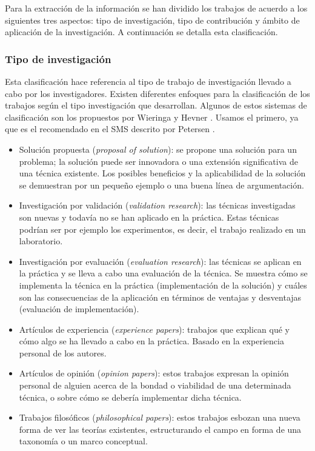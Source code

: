 Para la extracción de la información se han dividido los trabajos de acuerdo a los siguientes tres aspectos: tipo de investigación, tipo de contribución y ámbito de aplicación de la investigación. A continuación se detalla esta clasificación.

\subsubsection*{Tipo de investigación}
Esta clasificación hace referencia al tipo de trabajo de investigación llevado a cabo por los investigadores. Existen diferentes enfoques para la clasificación de los trabajos según el tipo investigación que desarrollan. Algunos de estos sistemas de clasificación son los propuestos por Wieringa \cite{Wieringa:2005} y Hevner \cite{Hevner:2004}. Usamos el primero, ya que es el recomendado en el SMS descrito por Petersen \cite{Petersen:2008}.
\begin{itemize}
\item Solución propuesta (\emph{proposal of solution}): se propone una solución para un problema; la solución puede ser innovadora o una extensión significativa de una técnica existente. Los posibles beneficios y la aplicabilidad de la solución se demuestran por un pequeño ejemplo o una buena línea de argumentación.
\item Investigación por validación (\emph{validation research}): las técnicas investigadas son nuevas y todavía no se han aplicado en la práctica. Estas técnicas podrían ser por ejemplo los experimentos, es decir, el trabajo realizado en un laboratorio.
\item Investigación por evaluación (\emph{evaluation research}): las técnicas se aplican en la práctica y se lleva a cabo una evaluación de la técnica. Se muestra cómo se implementa la técnica en la práctica (implementación de la solución) y cuáles son las consecuencias de la aplicación en términos de ventajas y desventajas (evaluación de implementación).
\item Artículos de experiencia (\emph{experience papers}): trabajos que explican qué y cómo algo se ha llevado a cabo en la práctica. Basado en la experiencia personal de los autores.
\item Artículos de opinión (\emph{opinion papers}): estos trabajos expresan la opinión personal de alguien acerca de la bondad o viabilidad de una determinada técnica, o sobre cómo se debería implementar dicha técnica.
\item Trabajos filosóficos (\emph{philosophical papers}): estos trabajos esbozan una nueva forma de ver las teorías existentes, estructurando el campo en forma de una taxonomía o un marco conceptual.
\end{itemize}

